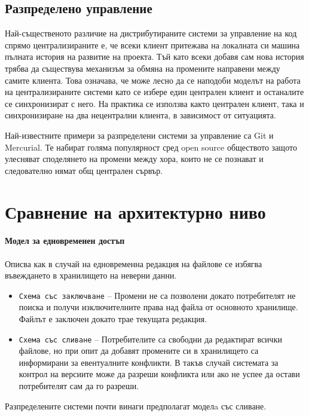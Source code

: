\documentclass[a4paper]{article}
\begin{document}
  \subsection{Разпределено управление}
  Най-същественото различие на дистрибутираните системи за управление на код
  спрямо централизираните е, че всеки клиент притежава на локалната си машина
  пълната история на развитие на проекта.  Тъй като всеки добавя сам нова
  история трябва да съществува механизъм за обмяна на промените направени между
  самите клиента. Това означава, че може лесно да се наподоби моделът на работа
  на централизираните системи като се избере един централен клиент и останалите
  се синхронизират с него. На практика се използва както централен клиент, така
  и синхронизиране на два нецентрални клиента, в зависимост от ситуацията.
  
  Най-известните примери за разпределени системи за управление са
  Git\cite{git} и Mercurial\cite{mercurial}. Те набират голяма популярност
  сред open source обществото защото улесняват споделянето на промени между
  хора, които не се познават и следователно нямат общ централен сървър.

\section{Сравнение на архитектурно ниво}

  \paragraph{Модел за едновременен достъп}
  Описва как в случай на едновременна редакция на файлове се избягва въвеждането в хранилището на неверни данни.
  \begin{itemize}
    \item \texttt{Схема със заключване} -- Промени не са позволени докато потребителят не поиска и получи изключителните права над файла от основното хранилище. Файлът е заключен докато трае текущата редакция.
    \item \texttt{Схема със сливане} -- Потребителите са свободни да редактират всички файлове, но при опит да добавят промените си в хранилището са информирани за евентуалните конфликти. В такъв случай системата за контрол на версиите може да разреши конфликта или ако не успее да остави потребителят сам да го разреши.
  \end{itemize}
  Разпределените системи почти винаги предполагат моделa със сливане.
\end{document}
